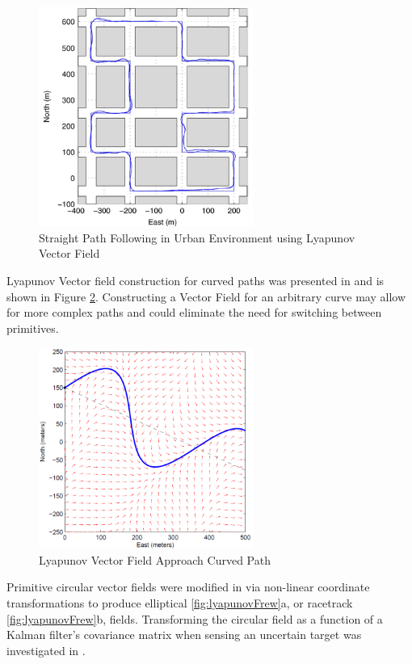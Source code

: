 \documentclass[numbered,pdftex]{ohio-etd}
\begin{document}
\begin{figure}[H]
	\centering
	\includegraphics[width=7cm]{PaperFigures/urbanFollowingNelson}
	\caption{Straight Path Following in Urban Environment \cite{nelson_cooperative_2005} using Lyapunov Vector Field}
	\label{fig:urbanfollowingnelson}
\end{figure}

Lyapunov Vector field construction for curved paths was presented in \cite{griffiths_vector_2006} and is shown in Figure \ref{fig:griffiths}. Constructing a Vector Field for an arbitrary curve may allow for more complex paths and could eliminate the need for switching between primitives. 

\begin{figure}[H]
	\centering
	\includegraphics[width=7cm]{PaperFigures/griffiths}
	\caption{Lyapunov Vector Field Approach Curved Path \cite{griffiths_vector_2006}}
	\label{fig:griffiths}
\end{figure}


Primitive circular vector fields were modified in \cite{frew_lyapunov_nodate,frew_cooperative_2007} via non-linear coordinate transformations to produce elliptical \ref{fig:lyapunovFrew}a, or racetrack \ref{fig:lyapunovFrew}b, fields. Transforming the circular field as a function of a Kalman filter's covariance matrix when sensing an uncertain target was investigated in \cite{frew_cooperative_2007}. 
\end{document}
